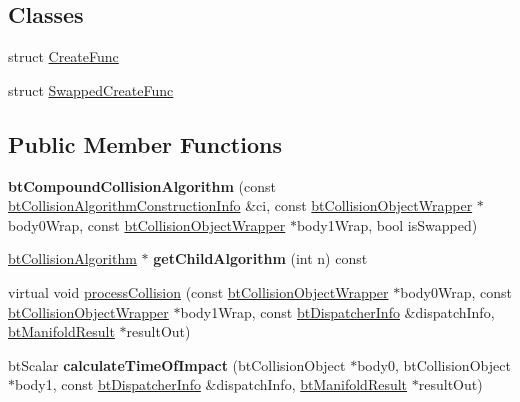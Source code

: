 \subsection*{Classes}
\begin{DoxyCompactItemize}
\item 
struct \hyperlink{structbtCompoundCollisionAlgorithm_1_1CreateFunc}{Create\+Func}
\item 
struct \hyperlink{structbtCompoundCollisionAlgorithm_1_1SwappedCreateFunc}{Swapped\+Create\+Func}
\end{DoxyCompactItemize}
\subsection*{Public Member Functions}
\begin{DoxyCompactItemize}
\item 
\mbox{\label{classbtCompoundCollisionAlgorithm_acb81b191f56f62a703723fe32523b505}} 
{\bfseries bt\+Compound\+Collision\+Algorithm} (const \hyperlink{structbtCollisionAlgorithmConstructionInfo}{bt\+Collision\+Algorithm\+Construction\+Info} \&ci, const \hyperlink{structbtCollisionObjectWrapper}{bt\+Collision\+Object\+Wrapper} $\ast$body0\+Wrap, const \hyperlink{structbtCollisionObjectWrapper}{bt\+Collision\+Object\+Wrapper} $\ast$body1\+Wrap, bool is\+Swapped)
\item 
\mbox{\label{classbtCompoundCollisionAlgorithm_af779babe4aaaa78c5d5193693236668e}} 
\hyperlink{classbtCollisionAlgorithm}{bt\+Collision\+Algorithm} $\ast$ {\bfseries get\+Child\+Algorithm} (int n) const
\item 
virtual void \hyperlink{classbtCompoundCollisionAlgorithm_a173ce993461795e0572dd2924c54cdc0}{process\+Collision} (const \hyperlink{structbtCollisionObjectWrapper}{bt\+Collision\+Object\+Wrapper} $\ast$body0\+Wrap, const \hyperlink{structbtCollisionObjectWrapper}{bt\+Collision\+Object\+Wrapper} $\ast$body1\+Wrap, const \hyperlink{structbtDispatcherInfo}{bt\+Dispatcher\+Info} \&dispatch\+Info, \hyperlink{classbtManifoldResult}{bt\+Manifold\+Result} $\ast$result\+Out)
\item 
\mbox{\label{classbtCompoundCollisionAlgorithm_aa223c7b4af581c9050a7ad20a1309ac0}} 
bt\+Scalar {\bfseries calculate\+Time\+Of\+Impact} (bt\+Collision\+Object $\ast$body0, bt\+Collision\+Object $\ast$body1, const \hyperlink{structbtDispatcherInfo}{bt\+Dispatcher\+Info} \&dispatch\+Info, \hyperlink{classbtManifoldResult}{bt\+Manifold\+Result} $\ast$result\+Out)

\end{DoxyCompactItemize}
